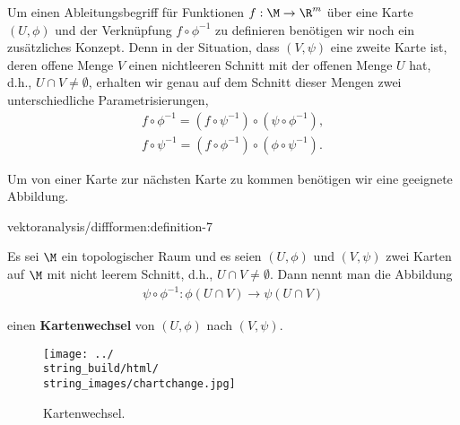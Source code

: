 \documentclass[letterpaper,10pt,english]{jupyterBook}
\begin{document}
\par
Um einen Ableitungsbegriff für Funktionen \(f:\M\to\R^m\) über eine Karte \((U,\phi)\) und der Verknüpfung \(f\circ \phi^{-1}\) zu definieren benötigen wir noch ein zusätzliches Konzept.
Denn in der Situation, dass \((V,\psi)\) eine zweite Karte ist, deren offene Menge \(V\) einen nichtleeren Schnitt mit der offenen Menge \(U\) hat, d.h., \(U\cap V \neq \emptyset\), erhalten wir genau auf dem Schnitt dieser Mengen zwei unterschiedliche Parametrisierungen,
\begin{align*}
f\circ \phi^{-1} = (f\circ\psi^{-1})\circ(\psi\circ \phi^{-1}),\\
f\circ \psi^{-1} = (f\circ\phi^{-1})\circ(\phi\circ \psi^{-1}).
\end{align*}
\par
Um von einer Karte zur nächsten Karte zu kommen benötigen wir eine geeignete Abbildung.
\begin{definition}{}{vektoranalysis/diffformen:definition-7}



\par
Es sei \(\M\) ein topologischer Raum und es seien \((U,\phi)\) und \((V,\psi)\) zwei Karten auf \(\M\) mit nicht leerem Schnitt, d.h., \(U\cap V\neq \emptyset\).
Dann nennt man die Abbildung
\begin{align*}
\psi\circ\phi^{-1}: \phi(U\cap V)\rightarrow \psi(U\cap V)
\end{align*}
\par
einen \textbf{Kartenwechsel} von \((U,\phi)\) nach \((V,\psi)\).
\end{definition}

\begin{figure}[htbp]
\centering


\noindent\texttt{[image: ../\\string\_build/html/\\string\_images/chartchange.jpg]}
\caption{Kartenwechsel.}\label{\detokenize{vektoranalysis/diffformen:fig-chartchange}}\end{figure}
\end{document}
